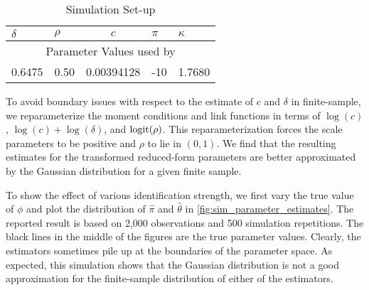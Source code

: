 \begin{table}[htb]
 
 \centering
 \caption{Simulation Set-up}
 \label{tbl:simulationParameters}
 
 \begin{tabularx}{.75\textwidth}{X X c X X}

  \toprule
  $\delta$ & $\rho$ & $c$ & $\pi$ & $\kappa$ \\
  \midrule
  \multicolumn{5}{c}{Parameter Values used by \textcite{han2018leverage}} \\
  \midrule
  0.6475  & 0.50  & \num[scientific-notation=true]{.00394128} & -10 & 1.7680 \\
  \bottomrule
%
 \end{tabularx}

\end{table}

 
To avoid boundary issues with respect to the estimate of $c$ and $\delta$ in finite-sample, we reparameterize the moment conditions and link functions in terms of $\log(c)$,  $\log(c) + \log(\delta)$, and $\operatorname*{logit}(\rho)$. This reparameterization forces the scale parameters to be positive and $\rho$ to lie in $(0,1)$. We find that the resulting estimates for the transformed reduced-form parameters are better approximated by the Gaussian distribution for a given finite sample. 

To show the effect of various identification strength, we first vary the true value of $\phi$ and plot the distribution of $\widehat{\pi}$ and $\widehat{\theta}$ in \cref{fig:sim_parameter_estimates}. The reported result is based on 2,000  observations and \num{500} simulation repetitions. The black lines in the middle of the figures are the true parameter values. Clearly, the estimators sometimes pile up at the boundaries of the parameter space. As expected, this simulation shows that the Gaussian distribution is not a good approximation for the finite-sample distribution of either of the estimators.


